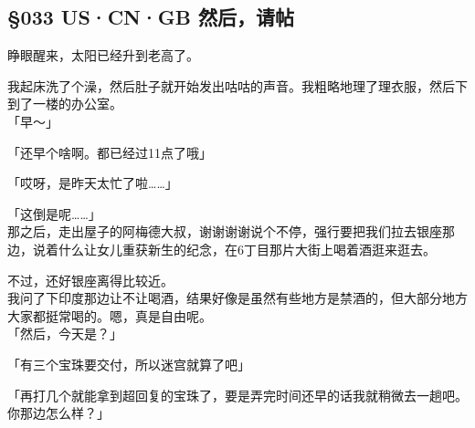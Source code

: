 \subsection{§033 US·CN·GB 然后，请帖}

睁眼醒来，太阳已经升到老高了。

我起床洗了个澡，然后肚子就开始发出咕咕的声音。我粗略地理了理衣服，然后下到了一楼的办公室。\\

「早～」

「还早个啥啊。都已经过11点了哦」

「哎呀，是昨天太忙了啦……」

「这倒是呢……」\\

那之后，走出屋子的阿梅德大叔，谢谢谢谢说个不停，强行要把我们拉去银座那边，说着什么让女儿重获新生的纪念，在6丁目那片大街上喝着酒逛来逛去。

不过，还好银座离得比较近。\\

我问了下印度那边让不让喝酒，结果好像是虽然有些地方是禁酒的，但大部分地方大家都挺常喝的。嗯，真是自由呢。\\

「然后，今天是？」

「有三个宝珠要交付，所以迷宫就算了吧」

「再打几个就能拿到超回复的宝珠了，要是弄完时间还早的话我就稍微去一趟吧。你那边怎么样？」


